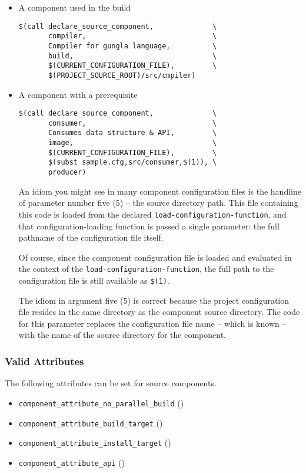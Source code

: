 \begin{itemize}
\item A component used in the build

\begin{verbatim}
$(call declare_source_component,              \
       compiler,                              \
       Compiler for gungla language,          \
       build,                                 \
       $(CURRENT_CONFIGURATION_FILE),         \
       $(PROJECT_SOURCE_ROOT)/src/cmpiler)
\end{verbatim}

\item A component with a prerequisite

\begin{verbatim}
$(call declare_source_component,              \
       consumer,                              \
       Consumes data structure & API,         \
       image,                                 \
       $(CURRENT_CONFIGURATION_FILE),         \
       $(subst sample.cfg,src/consumer,$(1)), \
       producer)
\end{verbatim}

An idiom you might see in many component configuration files is the
handline of parameter number five (5) -- the source directory path.
This file containing this code is loaded from the declared
\texttt{load-configuration-function}, and that configuration-loading
function is passed a single parameter: the full pathname of the
configuration file itself.

Of course, since the component configuration file is loaded and
evaluated in the context of the \texttt{load-configuration-function},
the full path to the configuration file is still available as
\texttt{\$(1)}.

The idiom in argument five (5) is correct because the project
configuration file resides in the same directory as the component
source directory.  The code for this parameter replaces the
configuration file name -- which is known -- with the name of the
source directory for the component.

\end{itemize}


\subsubsection{Valid Attributes}

The following attributes can be set for source components.

\begin{itemize}
\item{\texttt{component\_attribute\_no\_parallel\_build}}
  ()
\item{\texttt{component\_attribute\_build\_target}}  ()
\item{\texttt{component\_attribute\_install\_target}} ()
\item{\texttt{component\_attribute\_api}} ()
\end{itemize}

